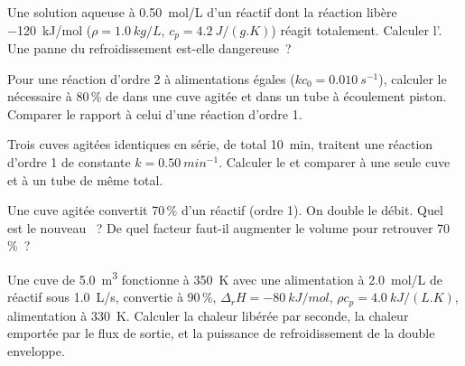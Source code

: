 \begin{exercise}[$\star$]\label{exo:b2:continuous-reactors:4}
Une solution aqueuse à \qty{0.50}{mol/L} d'un réactif dont la réaction
libère \qty{-120}{kJ/mol} ($\rho = \qty{1.0}{kg/L}$, $c_p =
\qty{4.2}{J/(g.K)}$) réagit totalement. Calculer l'. Une panne du refroidissement est-elle dangereuse~?
\end{exercise}

\begin{exercise}[$\star\star$]\label{exo:b2:continuous-reactors:5}
Pour une réaction d'ordre 2 à alimentations égales ($kc_0 = \qty{0.010}{s^{-1}}$),
calculer le  nécessaire à 80\,\% de  dans une cuve agitée et dans un
tube à écoulement piston. Comparer le rapport à celui d'une réaction d'ordre 1.
\end{exercise}

\begin{exercise}[$\star\star$]\label{exo:b2:continuous-reactors:6}
Trois cuves agitées identiques en série, de  total \qty{10}{min},
traitent une réaction d'ordre 1 de constante $k = \qty{0.50}{min^{-1}}$. Calculer le
 et comparer à une seule cuve et à un tube de même 
total.
\end{exercise}

\begin{exercise}[$\star\star$]\label{exo:b2:continuous-reactors:7}
Une cuve agitée convertit 70\,\% d'un réactif (ordre 1). On double le
débit. Quel est le nouveau ~? De quel facteur faut-il augmenter le volume pour
retrouver 70\,\%~?
\end{exercise}

\begin{exercise}[$\star\star$]\label{exo:b2:continuous-reactors:8}
Une cuve de \qty{5.0}{m^3} fonctionne à \qty{350}{K} avec une alimentation à
\qty{2.0}{mol/L} de réactif sous \qty{1.0}{L/s}, convertie à 90\,\%, $\Delta_r H
= \qty{-80}{kJ/mol}$, $\rho c_p = \qty{4.0}{kJ/(L.K)}$, alimentation à \qty{330}{K}.
Calculer la chaleur libérée par seconde, la chaleur emportée par le flux de
sortie, et la puissance de refroidissement de la double enveloppe.
\end{exercise}

